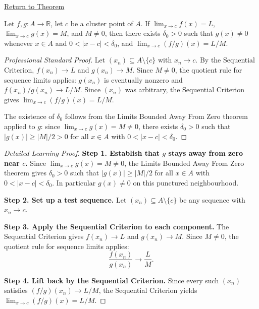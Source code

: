 \newpage
{}
\label{prf:limit-quotient}

\begin{remark*}[Return]
\hyperref[thm:limit-quotient]{Return to Theorem}
\end{remark*}

\begin{theorem*}
Let $f, g : A \to \mathbb{R}$, let $c$ be a cluster point of $A$. If
$\lim_{x\to c}f(x)=L$, $\lim_{x\to c}g(x)=M$, and $M \neq 0$, then there
exists $\delta_0 > 0$ such that $g(x) \neq 0$ whenever $x \in A$ and
$0 < |x-c| < \delta_0$, and $\lim_{x\to c}(f/g)(x) = L/M$.
\end{theorem*}

\begin{proof}[Professional Standard Proof]
\LRAProofBodyStart
Let $(x_n) \subseteq A \setminus \{c\}$ with $x_n \to c$.
By the Sequential Criterion, $f(x_n) \to L$ and $g(x_n) \to M$.
Since $M \neq 0$, the quotient rule for sequence limits applies: $g(x_n)$
is eventually nonzero and $f(x_n)/g(x_n) \to L/M$.
Since $(x_n)$ was arbitrary, the Sequential Criterion gives
$\lim_{x\to c}(f/g)(x) = L/M$.

The existence of $\delta_0$ follows from the Limits Bounded Away From Zero
theorem applied to $g$: since $\lim_{x\to c}g(x)=M \neq 0$, there exists
$\delta_0 > 0$ such that $|g(x)| \geq |M|/2 > 0$ for all $x \in A$ with
$0 < |x-c| < \delta_0$.
\end{proof}

\begin{proof}[Detailed Learning Proof]
\LRAProofBodyStart
\textbf{Step 1. Establish that $g$ stays away from zero near $c$.}
Since $\lim_{x\to c}g(x) = M \neq 0$, the Limits Bounded Away From Zero
theorem gives $\delta_0 > 0$ such that $|g(x)| \geq |M|/2$ for all
$x \in A$ with $0 < |x-c| < \delta_0$. In particular $g(x) \neq 0$
on this punctured neighbourhood.

\textbf{Step 2. Set up a test sequence.}
Let $(x_n) \subseteq A \setminus \{c\}$ be any sequence with $x_n \to c$.

\textbf{Step 3. Apply the Sequential Criterion to each component.}
The Sequential Criterion gives $f(x_n) \to L$ and $g(x_n) \to M$.
Since $M \neq 0$, the quotient rule for sequence limits applies:
\[
  \frac{f(x_n)}{g(x_n)} \to \frac{L}{M}.
\]

\textbf{Step 4. Lift back by the Sequential Criterion.}
Since every such $(x_n)$ satisfies $(f/g)(x_n) \to L/M$, the Sequential
Criterion yields $\lim_{x\to c}(f/g)(x) = L/M$.
\end{proof}

